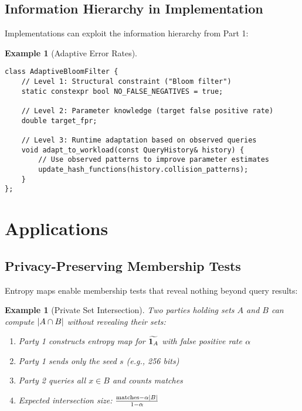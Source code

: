 \documentclass[11pt,final,hidelinks]{article}
\newtheorem{example}[theorem]{Example}
\begin{document}
\subsection{Information Hierarchy in Implementation}

Implementations can exploit the information hierarchy from Part 1:

\begin{example}[Adaptive Error Rates]
\begin{verbatim}
class AdaptiveBloomFilter {
    // Level 1: Structural constraint ("Bloom filter")
    static constexpr bool NO_FALSE_NEGATIVES = true;
    
    // Level 2: Parameter knowledge (target false positive rate)
    double target_fpr;
    
    // Level 3: Runtime adaptation based on observed queries
    void adapt_to_workload(const QueryHistory& history) {
        // Use observed patterns to improve parameter estimates
        update_hash_functions(history.collision_patterns);
    }
};
\end{verbatim}
\end{example}

\section{Applications}

\subsection{Privacy-Preserving Membership Tests}

Entropy maps enable membership tests that reveal nothing beyond query results:

\begin{example}[Private Set Intersection]
Two parties holding sets $A$ and $B$ can compute $\lvert A \cap B\rvert$ without revealing their sets:
\begin{enumerate}
    \item Party 1 constructs entropy map for $\widetilde{\mathbf{1}_{A}}$ with false positive rate $\alpha$
    \item Party 1 sends only the seed $s$ (e.g., 256 bits)
    \item Party 2 queries all $x \in B$ and counts matches
    \item Expected intersection size: $\frac{\text{matches} - \alpha \lvert B\rvert}{1 - \alpha}$
\end{enumerate}
\end{example}
\end{document}
